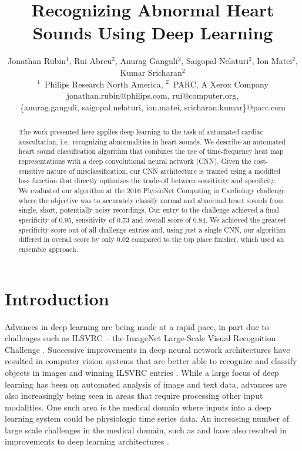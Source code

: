 \documentclass{article}
\title{Recognizing Abnormal Heart Sounds Using Deep Learning}
\author{Jonathan Rubin$^1$, Rui Abreu$^2$, Anurag Ganguli$^2$, Saigopal Nelaturi$^2$, Ion Matei$^2$, Kumar Sricharan$^2$\\ 
$^1$~Philips Research North America, $^2$~PARC, A Xerox Company\\
jonathan.rubin@philips.com, rui@computer.org,\\\{anurag.ganguli, saigopal.nelaturi, ion.matei, sricharan.kumar\}@parc.com}
\begin{document}
\maketitle

\begin{abstract}

The work presented here applies deep learning to the task of automated cardiac auscultation, i.e.~recognizing abnormalities in heart sounds. We describe an automated heart sound classification algorithm that combines the use of time-frequency heat map representations with a deep convolutional neural network (CNN). Given the cost-sensitive nature of misclassification, our CNN architecture is trained using a modified loss function that directly optimizes the trade-off between sensitivity and specificity. We evaluated our algorithm at the 2016 PhysioNet Computing in Cardiology challenge where the objective was to accurately classify normal and abnormal heart sounds from single, short, potentially noisy recordings. Our entry to the challenge achieved a final specificity of 0.95, sensitivity of 0.73 and overall score of 0.84. We achieved the greatest specificity score out of all challenge entries and, using just a single CNN, our algorithm differed in overall score by only 0.02 compared to the top place finisher, which used an ensemble approach.

\end{abstract}

\section{Introduction}
\label{sec:introduction}

Advances in deep learning \cite{lecun2015deep} are being made at a rapid pace, in part due to challenges such as ILSVRC -- the ImageNet Large-Scale Visual Recognition Challenge \cite{ILSVRC15}. Successive improvements in deep neural network architectures have resulted in computer vision systems that are better able to recognize and classify objects in images \cite{DBLP:journals/corr/LinCY13,DBLP:journals/corr/SzegedyVISW15} and winning ILSVRC entries \cite{DBLP:journals/corr/SzegedyLJSRAEVR14,DBLP:journals/corr/HeZRS15}. While a large focus of deep learning has been on automated analysis of image and text data, advances are also increasingly being seen in areas that require processing other input modalities. One such area is the medical domain where inputs into a deep learning system could be physiologic time series data. An increasing number of large scale challenges in the medical domain, such as \cite{web/kaggle/seizure-prediction} and \cite{web/kaggle/grasp-and-lift} have also resulted in improvements to deep learning architectures \cite{DBLP:conf/cvpr/LiangH15}.
\end{document}
